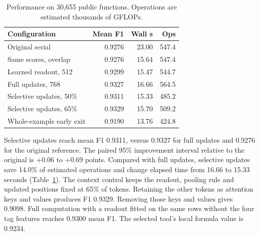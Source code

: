 \begin{table}[t]
\centering
\small\setlength{\tabcolsep}{3pt}
\caption{Performance on 30,655 public functions. Operations are estimated thousands of GFLOPs.}
\label{tab:performance}
\begin{tabular}{lrrr}
\toprule
Configuration & Mean F1 & Wall s & Ops \\
\midrule
Original serial & 0.9276 & 23.00 & 547.4 \\
Same scores, overlap & 0.9276 & 15.64 & 547.4 \\
Learned readout, 512 & 0.9299 & 15.47 & 544.7 \\
Full updates, 768 & 0.9327 & 16.66 & 564.5 \\
Selective updates, 50\% & 0.9311 & 15.33 & 485.2 \\
Selective updates, 65\% & 0.9329 & 15.70 & 509.2 \\
Whole-example early exit & 0.9190 & 13.76 & 424.8 \\
\bottomrule
\end{tabular}
\end{table}

Selective updates reach mean F1 0.9311, versus 0.9327 for full updates and 0.9276 for the original reference. The paired 95\% improvement interval relative to the original is +0.06 to +0.69 points. Compared with full updates, selective updates save 14.0\% of estimated operations and change elapsed time from 16.66 to 15.33 seconds (Table~\ref{tab:performance}). The context control keeps the readout, pooling rule and updated positions fixed at 65\% of tokens. Retaining the other tokens as attention keys and values produces F1 0.9329. Removing those keys and values gives 0.9098. Full computation with a readout fitted on the same rows without the four tag features reaches 0.9300 mean F1. The selected tool's local formula value is 0.9234.
